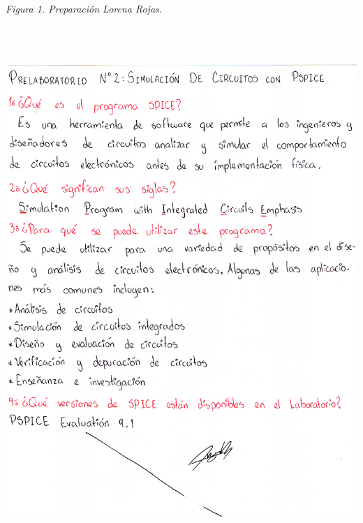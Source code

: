 \documentclass[12pt]{article}
\begin{document}
	\textit{Figura 1. Preparación Lorena Rojas.}
	\begin{center}
		\includegraphics[width=16cm,height=20cm]{Img/prelab_Lorena}
	\end{center}
	
\end{document}
